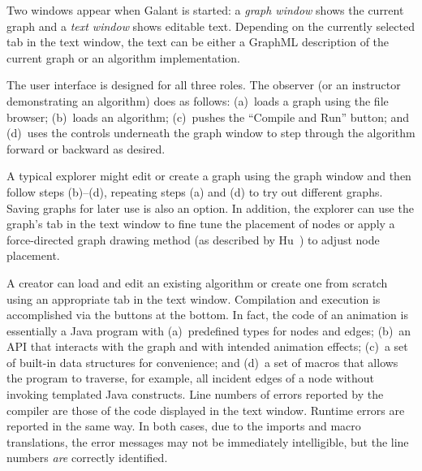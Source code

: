 Two windows appear when Galant is started: a \emph{graph window} shows the
current graph and a \emph{text window} shows editable text.
Depending on the currently selected tab in the text window,
the text can be either a GraphML description of the current graph or an
algorithm implementation. 

The user interface is designed for all three roles.
The observer (or an instructor demonstrating an algorithm) does as follows: (a)~loads a graph using the file browser; (b)~loads an algorithm; (c)~pushes the ``Compile and Run'' button; and (d)~uses
the controls underneath the graph window to step through the algorithm
forward or backward as desired.

A typical explorer might edit or create a graph using the graph window and then
follow steps (b)--(d), repeating steps (a) and (d) to try out different
graphs. Saving graphs for later use is also an option.
In addition, the explorer can use the graph's tab
in the text window to fine tune the placement of
nodes or apply a force-directed graph drawing method
(as described by Hu~\cite{2006-Mathematica-Hu}) to adjust node placement.

A creator can load and edit an existing algorithm or create one from scratch
using an appropriate tab in the text window.
Compilation and execution is accomplished via the buttons at the bottom.
In fact, the code of an animation is essentially a Java program with
(a)~predefined types for nodes and edges; (b)~an
API that interacts with the graph and with intended animation effects; (c)~a
set of built-in data structures for convenience; and (d)~a set of macros that
allows the program to traverse, for example, all incident edges of a node
without invoking templated Java constructs.
Line numbers of errors reported by the compiler are those of the code
displayed in the text window.
Runtime errors are reported in the same way.
In both cases, due to the imports and macro translations, the error messages
may not be immediately intelligible, but the line numbers \emph{are}
correctly identified.


